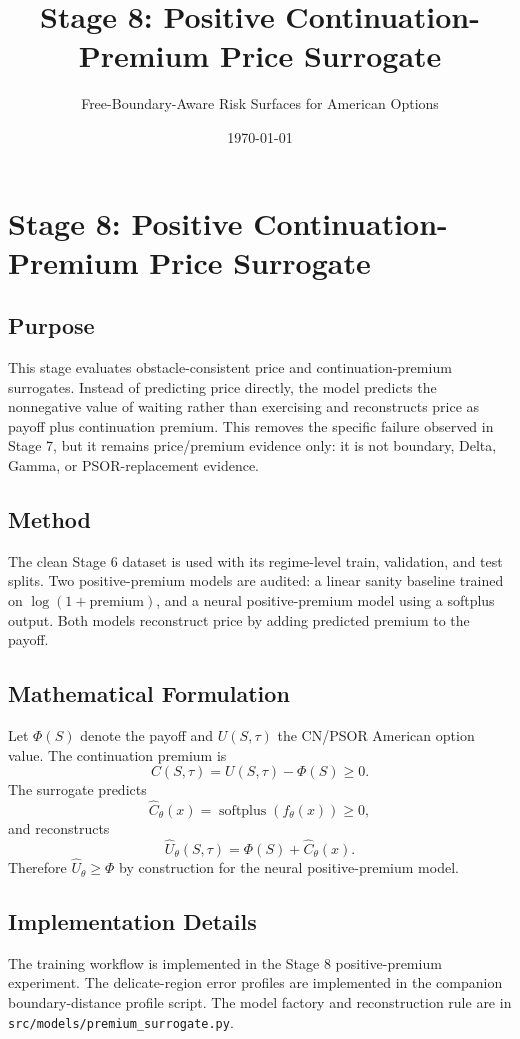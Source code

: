 \documentclass[11pt]{article}
\title{Stage 8: Positive Continuation-Premium Price Surrogate}
\author{Free-Boundary-Aware Risk Surfaces for American Options}
\date{\today}
\begin{document}
\maketitle

\section{Stage 8: Positive Continuation-Premium Price Surrogate}

\subsection{Purpose}
This stage evaluates obstacle-consistent price and continuation-premium
surrogates. Instead of predicting price directly, the model predicts the
nonnegative value of waiting rather than exercising and reconstructs price as
payoff plus continuation premium. This removes the specific failure observed in
Stage 7, but it remains price/premium evidence only: it is not boundary, Delta,
Gamma, or PSOR-replacement evidence.

\subsection{Method}
The clean Stage 6 dataset is used with its regime-level train, validation, and test splits. Two positive-premium models are audited: a linear sanity baseline trained on $\log(1+\mathrm{premium})$, and a neural positive-premium model using a softplus output. Both models reconstruct price by adding predicted premium to the payoff.

\subsection{Mathematical Formulation}
Let $\Phi(S)$ denote the payoff and $U(S,\tau)$ the CN/PSOR American option value. The continuation premium is
\[
C(S,\tau)=U(S,\tau)-\Phi(S)\geq 0.
\]
The surrogate predicts
\[
\widehat{C}_{\theta}(x)=\operatorname{softplus}(f_{\theta}(x))\geq 0,
\]
and reconstructs
\[
\widehat{U}_{\theta}(S,\tau)=\Phi(S)+\widehat{C}_{\theta}(x).
\]
Therefore $\widehat{U}_{\theta}\geq \Phi$ by construction for the neural positive-premium model.

\subsection{Implementation Details}
The training workflow is implemented in the Stage 8 positive-premium experiment. The delicate-region error profiles are implemented in the companion boundary-distance profile script. The model factory and reconstruction rule are in \texttt{src/models/premium\_surrogate.py}.
\end{document}
